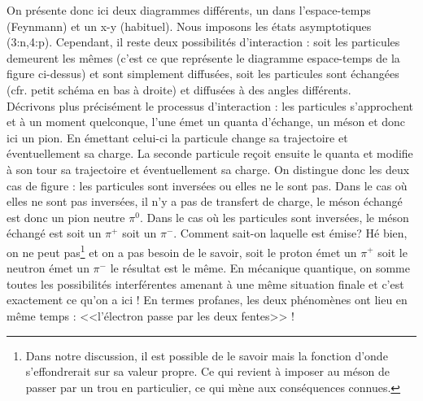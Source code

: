 On présente donc ici deux diagrammes différents, un dans l'espace-temps (Feynmann) et un x-y (habituel). Nous imposons les états asymptotiques (3:n,4:p). Cependant, il reste deux possibilités d'interaction : soit les particules demeurent les mêmes (c'est ce que représente le diagramme espace-temps de la figure ci-dessus) et sont simplement diffusées, soit les particules sont échangées (cfr. petit schéma en bas à droite) et diffusées à des angles différents.\\

Décrivons plus précisément le processus d'interaction : les particules s'approchent et à un moment quelconque, l'une émet un quanta d'échange, un méson et donc ici un pion. En émettant celui-ci la particule change sa trajectoire et éventuellement sa charge. La seconde particule reçoit ensuite le quanta et modifie à son tour sa trajectoire et éventuellement sa charge. On distingue donc les deux cas de figure : les particules sont inversées ou elles ne le sont pas. Dans le cas où elles ne sont pas inversées, il n'y a pas de transfert de charge, le méson échangé est donc un pion neutre $\pi^0$. Dans le cas où les particules sont inversées, le méson échangé est soit un $\pi^+$ soit un $\pi^-$. Comment sait-on laquelle est émise? Hé bien, on ne peut pas\footnote{Dans notre discussion, il est possible de le savoir mais la fonction d'onde s'effondrerait sur sa valeur propre. Ce qui revient à imposer au méson de passer par un trou en particulier, ce qui mène aux conséquences connues.} et on a pas besoin de le savoir, soit le proton émet un $\pi^+$ soit le neutron émet un $\pi^-$ le résultat est le même. En mécanique quantique, on somme toutes les possibilités interférentes amenant à une même situation finale et c'est exactement ce qu'on a ici ! En termes profanes, les deux phénomènes ont lieu en même temps : <<l'électron passe par les deux fentes>> !\\

